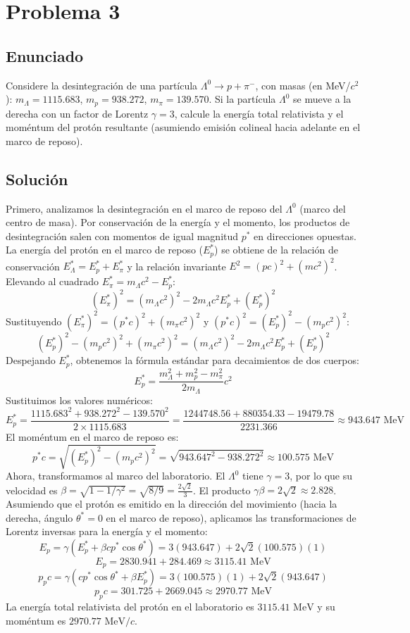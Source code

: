 \documentclass[a4paper,11pt]{article}
\begin{document}
\section{Problema 3}

\subsection{Enunciado}
Considere la desintegración de una partícula $\Lambda^0 \to p + \pi^-$, con masas (en MeV/$c^2$): $m_\Lambda = 1115.683$, $m_p = 938.272$, $m_\pi = 139.570$. Si la partícula $\Lambda^0$ se mueve a la derecha con un factor de Lorentz $\gamma = 3$, calcule la energía total relativista y el moméntum del protón resultante (asumiendo emisión colineal hacia adelante en el marco de reposo).

\subsection{Solución}
Primero, analizamos la desintegración en el marco de reposo del $\Lambda^0$ (marco del centro de masa). Por conservación de la energía y el momento, los productos de desintegración salen con momentos de igual magnitud $p^*$ en direcciones opuestas.
La energía del protón en el marco de reposo ($E_p^*$) se obtiene de la relación de conservación $E_\Lambda^* = E_p^* + E_\pi^*$ y la relación invariante $E^2 = (pc)^2 + (mc^2)^2$. Elevando al cuadrado $E_\pi^* = m_\Lambda c^2 - E_p^*$:
$$ (E_\pi^*)^2 = (m_\Lambda c^2)^2 - 2 m_\Lambda c^2 E_p^* + (E_p^*)^2 $$
Sustituyendo $(E_\pi^*)^2 = (p^*c)^2 + (m_\pi c^2)^2$ y $(p^*c)^2 = (E_p^*)^2 - (m_p c^2)^2$:
$$ (E_p^*)^2 - (m_p c^2)^2 + (m_\pi c^2)^2 = (m_\Lambda c^2)^2 - 2 m_\Lambda c^2 E_p^* + (E_p^*)^2 $$
Despejando $E_p^*$, obtenemos la fórmula estándar para decaimientos de dos cuerpos:
$$ E_p^* = \frac{m_\Lambda^2 + m_p^2 - m_\pi^2}{2 m_\Lambda} c^2 $$
Sustituimos los valores numéricos:
$$ E_p^* = \frac{1115.683^2 + 938.272^2 - 139.570^2}{2 \times 1115.683} = \frac{1244748.56 + 880354.33 - 19479.78}{2231.366} \approx 943.647 \text{ MeV} $$
El moméntum en el marco de reposo es:
$$ p^* c = \sqrt{(E_p^*)^2 - (m_p c^2)^2} = \sqrt{943.647^2 - 938.272^2} \approx 100.575 \text{ MeV} $$
Ahora, transformamos al marco del laboratorio. El $\Lambda^0$ tiene $\gamma = 3$, por lo que su velocidad es $\beta = \sqrt{1 - 1/\gamma^2} = \sqrt{8/9} = \frac{2\sqrt{2}}{3}$. El producto $\gamma \beta = 2\sqrt{2} \approx 2.828$.
Asumiendo que el protón es emitido en la dirección del movimiento (hacia la derecha, ángulo $\theta^* = 0$ en el marco de reposo), aplicamos las transformaciones de Lorentz inversas para la energía y el momento:
$$ E_p = \gamma (E_p^* + \beta c p^* \cos\theta^*) = 3(943.647) + 2\sqrt{2}(100.575)(1) $$
$$ E_p = 2830.941 + 284.469 \approx 3115.41 \text{ MeV} $$
$$ p_p c = \gamma (c p^* \cos\theta^* + \beta E_p^*) = 3(100.575)(1) + 2\sqrt{2}(943.647) $$
$$ p_p c = 301.725 + 2669.045 \approx 2970.77 \text{ MeV} $$
La energía total relativista del protón en el laboratorio es $3115.41 \text{ MeV}$ y su moméntum es $2970.77 \text{ MeV}/c$.
\end{document}
